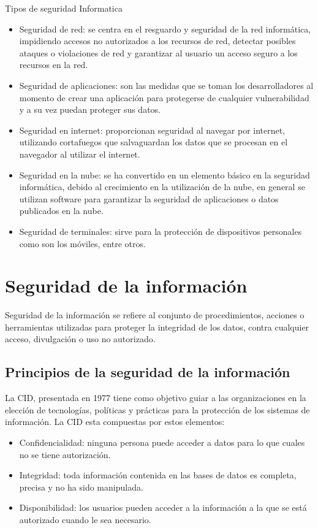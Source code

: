 \documentclass[12pt]{article}
\begin{document}
Tipos de seguridad Informatica
\begin{itemize}
\item Seguridad de red: se centra en el resguardo y seguridad de la red informática, impidiendo accesos no autorizados a los recursos de red, detectar posibles ataques o violaciones de red y garantizar al usuario un acceso seguro a los recursos en la red.
\item Seguridad de aplicaciones: son las medidas que se toman los desarrolladores al momento de crear una aplicación para protegerse de cualquier vulnerabilidad y a su vez puedan proteger sus datos.
\item Seguridad en internet: proporcionan seguridad al navegar por internet, utilizando cortafuegos que salvaguardan los datos que se procesan en el navegador al utilizar el internet.
\item Seguridad en la nube: se ha convertido en un elemento básico en la seguridad informática, debido al crecimiento en la utilización de la nube, en general se utilizan software para garantizar la seguridad de aplicaciones o datos publicados en la nube.
\item Seguridad de terminales: sirve para la protección de dispositivos personales como son los móviles, entre otros.
\end{itemize}


\section*{Seguridad de la información}

Seguridad de la información se refiere al conjunto de procedimientos, acciones o herramientas utilizadas para proteger la integridad de los datos, contra cualquier acceso, divulgación o uso no autorizado. 

\subsection{Principios de la seguridad de la información}

La CID, presentada en 1977 tiene como objetivo guiar a las organizaciones en la elección de tecnologías, políticas y prácticas para la protección de los sistemas de información. La CID esta compuestas por estos elementos:
\begin{itemize}
\item Confidencialidad: ninguna persona puede acceder a datos para lo que cuales no se tiene autorización.
\item Integridad: toda información contenida en las bases de datos es completa, precisa y no ha sido manipulada.
\item Disponibilidad: los usuarios pueden acceder a la información a la que se está autorizado cuando le sea necesario.
\end{itemize}
\end{document}
